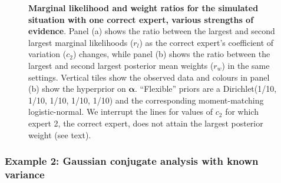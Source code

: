 \documentclass[12pt]{article}
\begin{document}
\begin{figure}[!ht]
\begin{center}
\end{center}
\caption{\textbf{Marginal likelihood and weight ratios for the simulated situation with one correct expert, various strengths of evidence}.
Panel (a) shows the ratio between the largest and second largest marginal likelihoods ($r_l$) as the correct expert's coefficient of variation ($c_2$) changes, while panel (b) shows the ratio between the largest and second largest posterior mean weights ($r_w$) in the same settings.
Vertical tiles show the observed data and colours in panel (b) show the hyperprior on $\boldsymbol\alpha$.
``Flexible'' priors are a Dirichlet(1/10, 1/10, 1/10, 1/10, 1/10) and the corresponding moment-matching logistic-normal.
We interrupt the lines for values of $c_2$ for which expert 2, the correct expert, does not attain the largest posterior weight (see text). 
}
\label{fig:one_correct_results_beta}
\end{figure}

\subsubsection{Example 2: Gaussian conjugate analysis with known variance}
\label{sec:learning_rate_Gaussian}
\end{document}
